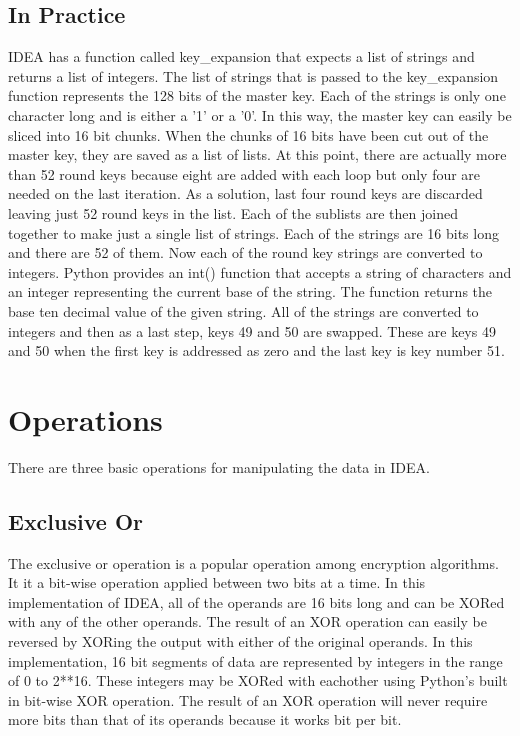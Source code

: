 \documentclass[12pt]{article}
\begin{document}
\subsection{In Practice}
IDEA has a function called key\_expansion that expects a list of strings and returns a list of integers. The list of strings that is passed to the key\_expansion function represents the 128 bits of the master key. Each of the strings is only one character long and is either a '1' or a '0'. In this way, the master key can easily be sliced into 16 bit chunks. 
When the chunks of 16 bits have been cut out of the master key, they are saved as a list of lists. At this point, there are actually more than 52 round keys because eight are added with each loop but only four are needed on the last iteration. As a solution, last four round keys are discarded leaving just 52 round keys in the list. Each of the sublists are then joined together to make just a single list of strings. Each of the strings are 16 bits long and there are 52 of them.
Now each of the round key strings are converted to integers. Python provides an int() function that accepts a string of characters and an integer representing the current base of the string. The function returns the base ten decimal value of the given string.
All of the strings are converted to integers and then as a last step, keys 49 and 50 are swapped. These are keys 49 and 50 when the first key is addressed as zero and the last key is key number 51.
\section{Operations}
There are three basic operations for manipulating the data in IDEA.
\subsection{Exclusive Or}
The exclusive or operation is a popular operation among encryption algorithms. It it a bit-wise operation applied between two bits at a time. In this implementation of IDEA, all of the operands are 16 bits long and can be XORed with any of the other operands. The result of an XOR operation can easily be reversed by XORing the output with either of the original operands.
In this implementation, 16 bit segments of data are represented by integers in the range of 0 to 2**16. These integers may be XORed with eachother using Python's built in bit-wise XOR operation. The result of an XOR operation will never require more bits than that of its operands because it works bit per bit.
\end{document}
